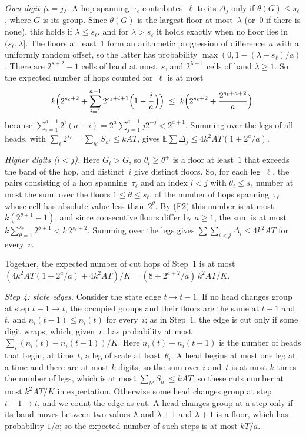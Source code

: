 \begin{informalproof}
\emph{Own digit ($i=j$).} A hop spanning~$\tau_\ell$ contributes~$\ell$ to its $\Delta_j$ only if $\theta(G)\le
s_\ell$, where $G$ is its group. Since $\theta(G)$ is the largest floor at most~$\lambda$ (or~$0$ if there is none),
this holds if $\lambda\le s_\ell$, and for $\lambda>s_\ell$ it holds exactly when no floor lies in $(s_\ell,\lambda]$.
The floors at least~$1$ form an arithmetic progression of difference~$a$ with a uniformly random offset, so the latter
has probability $\max(0,1-(\lambda-s_\ell)/a)$. There are $2^{s+2}-1$ cells of band at most~$s$, and $2^{\lambda+1}$
cells of band $\lambda\ge1$. So the expected number of hops counted for~$\ell$ is at most
\[
  k\Bigl(2^{s_\ell+2}+\sum_{i=1}^{a-1}2^{s_\ell+i+1}\Bigl(1-\frac ia\Bigr)\Bigr)
  \;\le\;k\Bigl(2^{s_\ell+2}+\frac{2^{s_\ell+a+2}}a\Bigr),
\]
because $\sum_{i=1}^{a-1}2^i(a-i)=2^a\sum_{j=1}^{a-1}j2^{-j}<2^{a+1}$. Summing over the legs of all heads, with
$\sum_\ell2^{s_\ell}=\sum_{h'}S_{h'}\le kAT$, gives $\mathbb E\sum\Delta_j\le4k^2AT(1+2^a/a)$.

\emph{Higher digits ($i<j$).} Here $G_i>G$, so $\theta_i\ge\theta^+$ is a floor at least~$1$ that exceeds the band
of the hop, and distinct~$i$ give distinct floors. So, for each leg~$\ell$, the pairs consisting of a hop
spanning~$\tau_\ell$ and an index $i<j$ with $\theta_i\le s_\ell$ number at most the sum, over the floors
$1\le\theta\le s_\ell$, of the number of hops spanning~$\tau_\ell$ whose cell has absolute value less than~$2^\theta$.
By (F2) this number is at most $k(2^{\theta+1}-1)$, and since consecutive floors differ by $a\ge1$, the sum is at most
$k\sum_{\theta=1}^{s_\ell}2^{\theta+1}<k\,2^{s_\ell+2}$. Summing over the legs gives
$\sum\sum_{i<j}\Delta_i\le4k^2AT$ for every~$r$.

Together, the expected number of cut hops of Step~1 is at most
$(4k^2AT(1+2^a/a)+4k^2AT)/K=(8+2^{a+2}/a)\,k^2AT/K$.

\emph{Step 4: state edges.} Consider the state edge $t\to t-1$. If no head changes group at step $t-1\to t$, the
occupied groups and their floors are the same at $t-1$ and~$t$, and $n_i(t-1)\le n_i(t)$ for every~$i$; as in
Step~1, the edge is cut only if some digit wraps, which, given~$r$, has probability at most
$\sum_i(n_i(t)-n_i(t-1))/K$. Here $n_i(t)-n_i(t-1)$ is the number of heads that begin, at time~$t$, a leg of scale at
least~$\theta_i$. A head begins at most one leg at a time and there are at most $k$ digits, so the sum over $i$
and~$t$ is at most $k$ times the number of legs, which is at most $\sum_{h'}S_{h'}\le kAT$; so these cuts number at
most $k^2AT/K$ in expectation. Otherwise some head changes group at step $t-1\to t$, and we count the edge as cut. A
head changes group at a step only if its band moves between two values $\lambda$ and $\lambda+1$ and $\lambda+1$ is a
floor, which has probability $1/a$; so the expected number of such steps is at most $kT/a$.


\end{informalproof}
